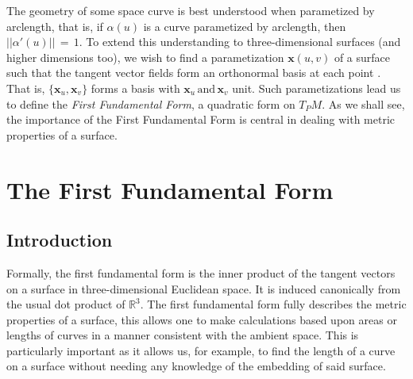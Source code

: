 \documentclass{UKZNcomp}
\newcommand{\vect}[1]{\mathbf{#1}} %
\theoremstyle{definition}
\theoremstyle{remark}
\begin{document}
The geometry of some space curve is best understood when parametized by arclength, that is, if $\alpha(u)$ is a curve parametized by arclength, then $\lvert\lvert\alpha'(u)\rvert\rvert \, = \, 1$. To extend this understanding to three-dimensional surfaces (and higher dimensions too), we wish to find a parametization  $\vect{x}(u,v)$ of a surface such that the tangent vector fields form an orthonormal basis at each point \cite{Shifrin2016}. That is, $\{\vect x_u,\vect x_v\}$ forms a basis with $ \vect x_u\, \text{and} \, \vect x_v$ unit. Such parametizations lead us to define the \textit{First Fundamental Form}, a quadratic form on $T_PM$. As we shall see, the importance of the First Fundamental Form is central in dealing with metric properties of a surface.
\clearpage
\chapter{The First Fundamental Form}
\section{Introduction}
Formally, the first fundamental form is the inner product of the tangent vectors on a surface in three-dimensional Euclidean space. It is induced canonically from the usual dot product of $\mathbb{R}^3$. The first fundamental form fully describes the metric properties of a surface, this allows one to make calculations based upon areas or lengths of curves in a manner consistent with the ambient space. This is particularly important as it allows us, for example, to find the length of a curve on a surface without needing any knowledge of the embedding of said surface. 
\end{document}

